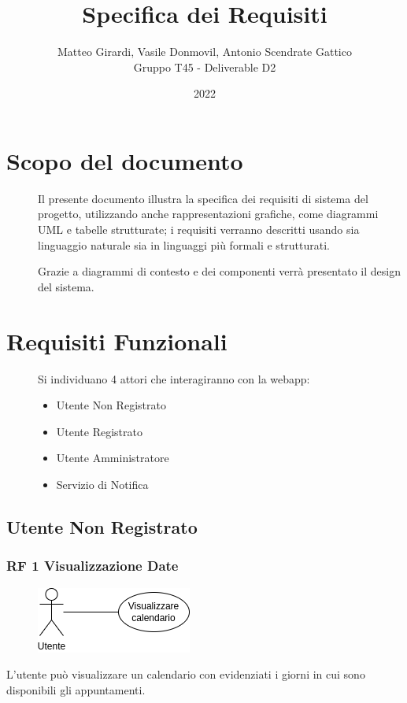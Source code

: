 \documentclass{article}
\title{\textbf{\Huge Specifica dei Requisiti}}
\author{Matteo Girardi, Vasile Donmovil, Antonio Scendrate Gattico \\ Gruppo T45 - Deliverable D2}
\date{2022}
\begin{document}
\maketitle

\clearpage
\tableofcontents
\clearpage

\section{Scopo del documento}
\begin{description}
	\item[] Il presente documento illustra la specifica dei requisiti di sistema del progetto, utilizzando anche rappresentazioni grafiche, come diagrammi UML e tabelle strutturate; i requisiti verranno descritti usando sia linguaggio naturale sia in linguaggi più formali e strutturati.
	\item[] Grazie a diagrammi di contesto e dei componenti verrà presentato il design del sistema.
\end{description}
\clearpage

\section{Requisiti Funzionali}
\begin{description}
	\item[] Si individuano 4 attori che interagiranno con la webapp:
	\begin{itemize}
		\item  Utente Non Registrato
		\item  Utente Registrato
		\item  Utente Amministratore
		\item  Servizio di Notifica
	\end{itemize}
\end{description}


\subsection{Utente Non Registrato}

\subsubsection{RF 1 Visualizzazione Date}\label{rf_1}
\begin{description}
	    
	\begin{figure}[htp]
		\centering
		\includegraphics[]{rf1.png}
	\end{figure}
	     
	\item L'utente può visualizzare un calendario con evidenziati i giorni in cui sono disponibili gli appuntamenti. 
\end{description}
\end{document}
